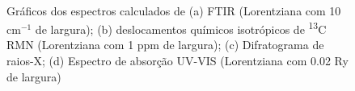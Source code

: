 	\begin{figure}[ht]
		\centering
		\\
		\caption{Gráficos dos espectros calculados de (a) FTIR (Lorentziana com 10 cm$^{-1}$ de largura); (b) deslocamentos químicos isotrópicos de \textsuperscript{13}C RMN (Lorentziana com 1 ppm de largura); (c) Difratograma de raios-X; (d) Espectro de absorção UV-VIS (Lorentziana com 0.02 Ry de largura)}
		\label{charac}
	\end{figure}

